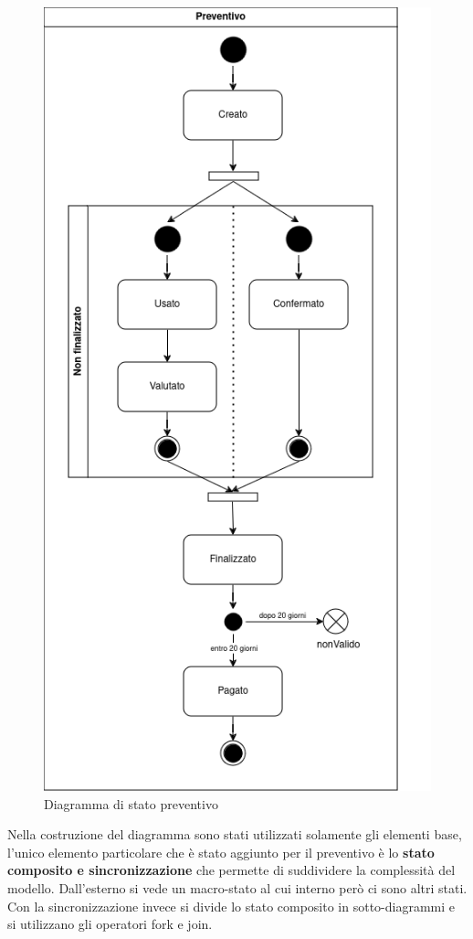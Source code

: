 \documentclass[a4paper, 11pt,oneside]{book}
\begin{document}
        \begin{figure}[H]
            \centering
            \includegraphics[scale=0.49]{diagramma di stato_preventivo.png}
            \caption{Diagramma di stato preventivo}
            \label{fig:diagramma_stato_preventivo}
        \end{figure}
        \pagebreak\noindent
        Nella costruzione del diagramma sono stati utilizzati solamente gli elementi base, l'unico elemento particolare che è stato aggiunto per il preventivo
        è lo \textbf{stato composito e sincronizzazione} che permette di suddividere la complessità del modello. Dall'esterno si vede un macro-stato al cui interno però ci sono altri stati. Con la sincronizzazione invece si divide lo stato composito in sotto-diagrammi
        e si utilizzano gli operatori fork e join.
\end{document}
